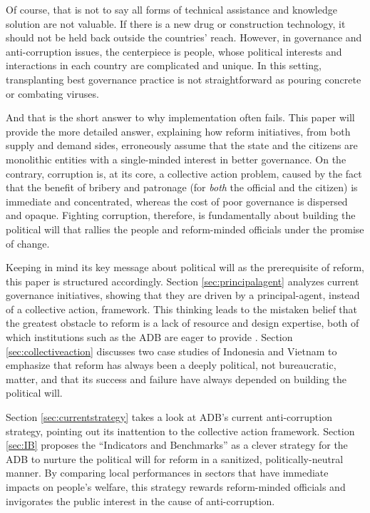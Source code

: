 \documentclass[12pt]{article}
\begin{document}
Of course, that is not to say all forms of technical assistance and knowledge solution are not valuable. If there is a new drug or construction technology, it should not be held back outside the countries' reach. However, in governance and anti-corruption issues, the centerpiece is people, whose political interests and interactions in each country are complicated and unique. In this setting, transplanting best governance practice is not straightforward as pouring concrete or combating viruses.

And that is the short answer to why implementation often fails. This paper will provide the more detailed answer, explaining how reform initiatives, from both supply and demand sides, erroneously assume that the state and the citizens are monolithic entities with a single-minded interest in better governance. On the contrary, corruption is, at its core, a collective action problem, caused by the fact that the benefit of bribery and patronage (for \textit{both} the official and the citizen) is immediate and concentrated, whereas the cost of poor governance is dispersed and opaque. Fighting corruption, therefore, is fundamentally about building the political will that rallies the people and reform-minded officials under the promise of change.

Keeping in mind its key message about political will as the prerequisite of reform, this paper is structured accordingly. Section \ref{sec:principalagent} analyzes current governance initiatives, showing that they are driven by a principal-agent, instead of a collective action, framework. This thinking leads to the mistaken belief that the greatest obstacle to reform is a lack of resource and design expertise, both of which institutions such as the ADB are eager to provide \citep[16]{GlobalIntegrity2012}. Section \ref{sec:collectiveaction} discusses two case studies of Indonesia and Vietnam to emphasize that reform has always been a deeply political, not bureaucratic, matter, and that its success and failure have always depended on building the political will.

Section \ref{sec:currentstrategy} takes a look at ADB's current anti-corruption strategy, pointing out its inattention to the collective action framework. Section \ref{sec:IB} proposes the ``Indicators and Benchmarks'' as a clever strategy for the ADB to nurture the political will for reform in a sanitized, politically-neutral manner. By comparing local performances in sectors that have immediate impacts on people's welfare, this strategy rewards reform-minded officials and invigorates the public interest in the cause of anti-corruption.
\end{document}
